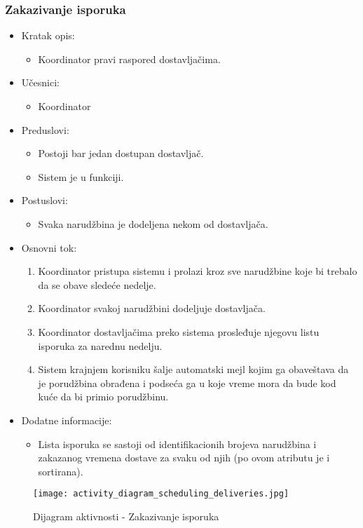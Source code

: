 
\subsubsection{Zakazivanje isporuka}

\begin{itemize}
	\item Kratak opis:
		\begin{itemize}
			\item Koordinator pravi raspored dostavljačima.
		\end{itemize}
	\item Učesnici:
		\begin{itemize}
		    \item Koordinator
		\end{itemize}
	\item Preduslovi:
		\begin{itemize}
		    \item Postoji bar jedan dostupan dostavljač.
		    \item Sistem je u funkciji.
		\end{itemize}
	\item Postuslovi:
		\begin{itemize}
			\item Svaka narudžbina je dodeljena nekom od dostavljača.
	\end{itemize}
	\item Osnovni tok:
		\begin{enumerate}
            \item Koordinator pristupa sistemu i prolazi kroz sve narudžbine koje bi trebalo da se obave sledeće nedelje.
           \item Koordinator svakoj narudžbini dodeljuje dostavljača.
            \item Koordinator dostavljačima preko sistema prosleđuje njegovu listu isporuka za narednu nedelju.
            \item Sistem krajnjem korisniku šalje automatski mejl kojim ga obaveštava da je porudžbina obrađena i podseća  ga u koje vreme mora da bude kod kuće da bi primio porudžbinu.
		\end{enumerate}
   \item Dodatne informacije:
        \begin{itemize}
            \item Lista isporuka se sastoji od identifikacionih brojeva narudžbina i zakazanog vremena dostave za svaku od njih (po ovom atributu je i sortirana). 
        \end{itemize}
\end{itemize}

\begin{figure}[H]
\begin{center}
\texttt{[image: activity\_diagram\_scheduling\_deliveries.jpg]}
\end{center}
    \caption{Dijagram aktivnosti - Zakazivanje isporuka}
\label{fig:Activity_diagram_scheduling_deliveries}
\end{figure}

